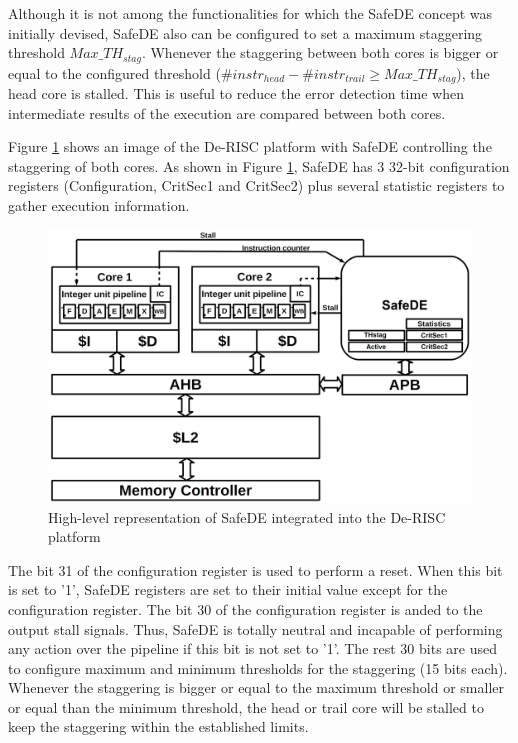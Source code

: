 Although it is not among the functionalities for which the SafeDE concept was initially devised, SafeDE also can be configured to set a maximum staggering threshold $Max\_TH_{stag}$. Whenever the staggering between both cores is bigger or equal to the configured threshold ($\#instr_{head} - \#instr_{trail} \geq Max\_TH_{stag}$), the head core is stalled. This is useful to reduce the error detection time when intermediate results of the execution are compared between both cores.

Figure \ref{fig:De-RISC_SafeDE} shows an image of the De-RISC platform with SafeDE controlling the staggering of both cores. As shown in Figure \ref{fig:De-RISC_SafeDE}, SafeDE has 3 32-bit configuration registers (Configuration, CritSec1 and CritSec2) plus several statistic registers to gather execution information.

\begin{figure}[h]
    \centering
    \includegraphics[scale=0.25]{img/system.png}
    \caption{High-level representation of SafeDE integrated into the De-RISC platform}
    \label{fig:De-RISC_SafeDE}
\end{figure}

The bit 31 of the configuration register is used to perform a reset. When this bit is set to '1', SafeDE registers are set to their initial value except for the configuration register. The bit 30 of the configuration register is anded to the output stall signals. Thus, SafeDE is totally neutral and incapable of performing any action over the pipeline if this bit is not set to '1'. The rest 30 bits are used to configure maximum and minimum thresholds for the staggering (15 bits each). Whenever the staggering is bigger or equal to the maximum threshold or smaller or equal than the minimum threshold, the head or trail core will be stalled to keep the staggering within the established limits.  


